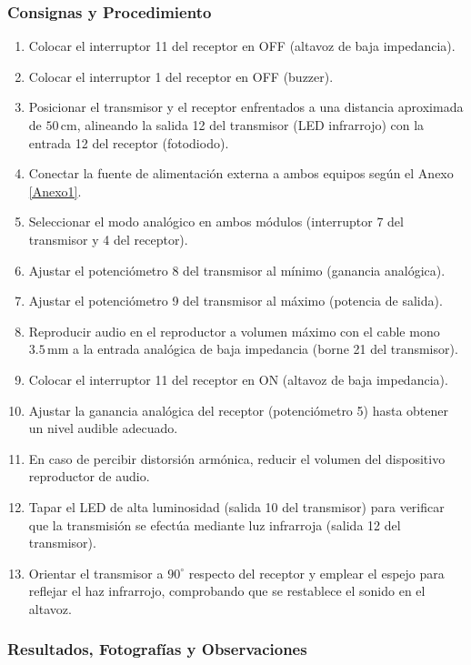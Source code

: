 \subsubsection*{Consignas y Procedimiento}
\begin{enumerate}
    \item Colocar el interruptor 11 del receptor en OFF (altavoz de baja impedancia).
    \item Colocar el interruptor 1 del receptor en OFF (buzzer).
    \item Posicionar el transmisor y el receptor enfrentados a una distancia aproximada de $50\,\text{cm}$, alineando la salida 12 del transmisor (LED infrarrojo) con la entrada 12 del receptor (fotodiodo).
    \item Conectar la fuente de alimentación externa a ambos equipos según el Anexo \ref{Anexo1}.
    \item Seleccionar el modo analógico en ambos módulos (interruptor 7 del transmisor y 4 del receptor).
    \item Ajustar el potenciómetro 8 del transmisor al mínimo (ganancia analógica).
    \item Ajustar el potenciómetro 9 del transmisor al máximo (potencia de salida).
    \item Reproducir audio en el reproductor a volumen máximo con el cable mono $3.5\,\text{mm}$ a la entrada analógica de baja impedancia (borne 21 del transmisor).
    \item Colocar el interruptor 11 del receptor en ON (altavoz de baja impedancia).
    \item Ajustar la ganancia analógica del receptor (potenciómetro 5) hasta obtener un nivel audible adecuado.
    \item En caso de percibir distorsión armónica, reducir el volumen del dispositivo reproductor de audio.
    \item Tapar el LED de alta luminosidad (salida 10 del transmisor) para verificar que la transmisión se efectúa mediante luz infrarroja (salida 12 del transmisor).
    \item Orientar el transmisor a $90^\circ$ respecto del receptor y emplear el espejo para reflejar el haz infrarrojo, comprobando que se restablece el sonido en el altavoz.
\end{enumerate}

\subsubsection*{Resultados, Fotografías y Observaciones}

